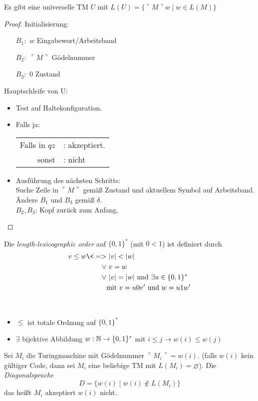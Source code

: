 \begin{Satz}
	Es gibt eine universelle \ac{TM} $U$ mit $L(U) = \{ \ulcorner M \urcorner w\mid w \in L(M)\}$
\end{Satz}
\begin{proof}
	Initialisierung:
	\begin{itemize}
		\item[$B_1:$] $w$ Eingabewort/Arbeitsband
		\item[$B_2:$] $\ulcorner M \urcorner$ Gödelnummer
		\item[$B_3:$] 0 Zustand
	\end{itemize}
	Hauptschleife von U:
	\begin{itemize}
		\item Test auf Haltekonfiguration.
		\item Falls ja: 
		\begin{tabular}[t]{@{}r@{\,}l}
			Falls in $qz$ &: akzeptiert.\\
			sonst&: nicht
		\end{tabular}
		\item Ausführung des nächsten Schritts:\\
		Suche Zeile in $\ulcorner M \urcorner$ gemäß Zustand und aktuellem Symbol auf Arbeitsband.
		Ändere $B_1$ und $B_3$ gemäß $\delta$.\\
		$B_2, B_3$: Kopf zurück zum Anfang.
	\end{itemize}
\end{proof}
\begin{Def}[name={[length-lexicographic order]}]
	Die \emph{length-lexicographic order} auf $\{0, 1\}^*$ (mit $0<1$) ist definiert durch
	\begin{align*}
		v \leq w \<=> &\ |v| < |w|\\
		\vee &\ v = w\\
		\vee &\ |v| = |w| \text{ und } \exists u\in \{0, 1\}^*\\
		& \text{mit } v = u0v' \text{ und } w = u1w'
	\end{align*}
\end{Def}
\begin{Satz}[name={[$\leq:$ totale Ordnung]}]\
	\begin{itemize}
		\item $\leq$ ist totale Ordnung auf $\{0, 1\}^*$
		\item $\exists$ bijektive Abbildung $w: \mathbb{N} \to \{0, 1\}^*$ mit $i \leq j \to w(i) \leq w(j)$
	\end{itemize}
\end{Satz}
\begin{Def}[name={[Diagonalsprache]}]
	Sei $M_i$ die Turingmaschine mit Gödelnummer $\ulcorner M_i\urcorner = w(i)$.
	(falls $w(i)$ kein gültiger Code, dann sei $M_i$ eine beliebige \ac{TM} mit $L(M_i) = \varnothing$). Die \emph{Diagonalsprache}
	\[D = \{w(i) \mid w(i) \notin L(M_i)\}\]
	das heißt $M_i$ akzeptiert $w(i)$ nicht.
\end{Def}
